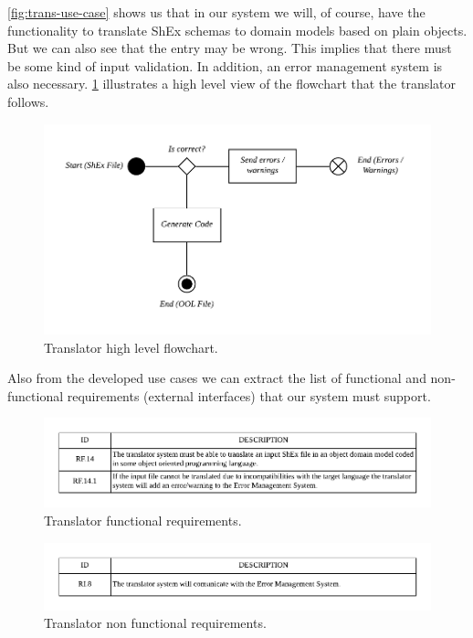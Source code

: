 \cref{fig:trans-use-case} shows us that in our system we will, of course, have the functionality to
translate ShEx schemas to domain models based on plain objects.
But we can also see that the entry may be wrong.
This implies that there must be some kind of input validation.
In addition, an error management system is also necessary.
\cref{fig:trans-flow} illustrates a high level view of the flowchart that the translator follows.

\begin{figure}
    \includegraphics[width=\textwidth]{images/diagrama-flujo-traductor.pdf}
    \centering
    \caption[Translator high level flowchart]{Translator high level flowchart.}
    \label{fig:trans-flow}
\end{figure}

Also from the developed use cases we can extract the list of functional and
non-functional requirements (external interfaces) that our system must support.

\begin{figure}[h!]
    \includegraphics[width=\textwidth]{images/trans-reqf.pdf}
    \centering
    \caption[Translator functional requirements]{Translator functional requirements.}
    \label{fig:trans-reqf}
\end{figure}

\begin{figure}[h!]
    \includegraphics[width=\textwidth]{images/trans-reqnf.pdf}
    \centering
    \caption[Translator non functional requirements]{Translator non functional requirements.}
    \label{fig:trans-reqnf}
\end{figure}

